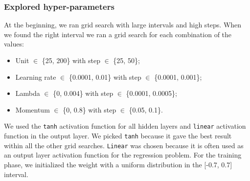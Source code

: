 \subsubsection{Explored hyper-parameters}
At the beginning, we ran grid search with large intervals and high steps. When we found the right interval we ran a grid search for each combination of the values:

\begin{itemize}
	\item Unit $\in$ \{25, 200\} with step $\in$ \{25, 50\};
	\item Learning rate $\in$ \{0.0001, 0.01\} with step $\in$ \{0.0001, 0.001\};
	\item Lambda $\in$ \{0, 0.004\} with step $\in$ \{0.0001,  0.0005\};
	\item Momentum $\in$ \{0, 0.8\} with step $\in$ \{0.05,  0.1\}.
\end{itemize}
\vspace{0.3cm}
We used the \texttt{tanh} activation function for all hidden layers and \texttt{linear} activation function in the output layer. We picked \texttt{tanh} because it gave the best result within all the other grid searches. \texttt{Linear} was chosen because it is often used as an output layer activation function for the regression problem.
For the training phase, we initialized the weight with a uniform distribution in the [-0.7, 0.7] interval.

